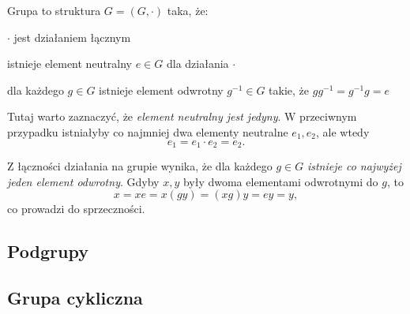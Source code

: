 \pdef

{\color{def}Grupa} to struktura $G=(G, \cdot)$ taka, że:

\point $\cdot$ jest działaniem łącznym

\point istnieje element neutralny $e\in G$ dla działania $\cdot$

\point dla każdego $g\in G$ istnieje element odwrotny $g^{-1}\in G$ takie, że $gg^{-1}=g^{-1}g=e$
\smallskip

\kdef

Tutaj warto zaznaczyć, że \emph{element neutralny jest jedyny}. W przeciwnym przypadku istniałyby co najmniej dwa elementy neutralne $e_1,e_2$, ale wtedy
$$e_1=e_1\cdot e_2=e_2.$$

Z łączności działania na grupie wynika, że dla każdego $g\in G$ \emph{istnieje co najwyżej jeden element odwrotny}. Gdyby $x,y$ były dwoma elementami odwrotnymi do $g$, to
$$x=xe=x(gy)=(xg)y=ey=y,$$
co prowadzi do sprzeczności.

\subsection{Podgrupy}

\subsection{Grupa cykliczna}